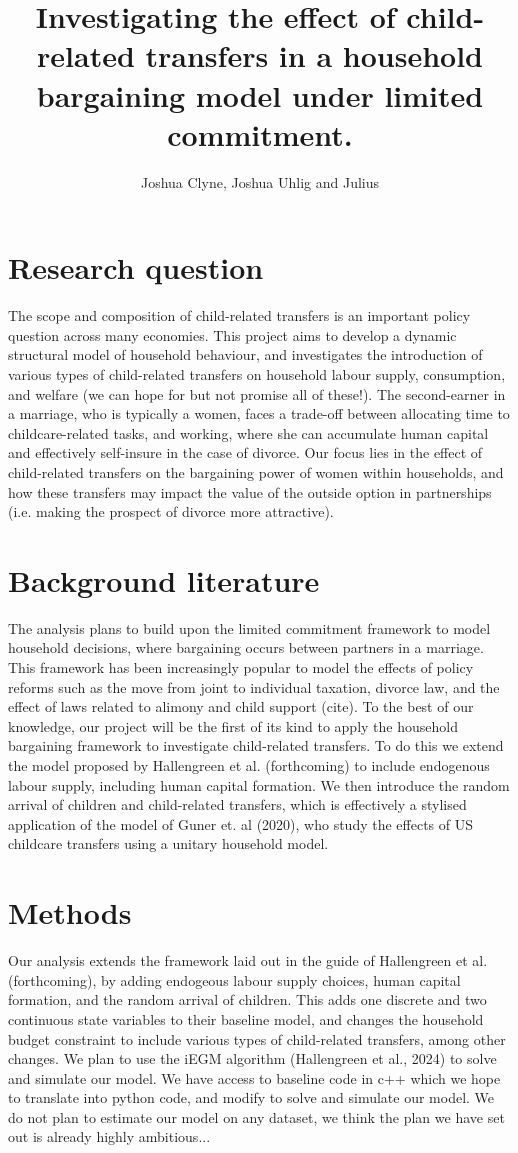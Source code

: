 \documentclass{article}
\title{Investigating the effect of child-related transfers in a household bargaining model under limited commitment.}
\author{Joshua Clyne, Joshua Uhlig and Julius}
\begin{document}
\maketitle
\section{Research question}


The scope and composition of child-related transfers is an important policy question across many economies. This project aims to develop a dynamic structural model of household behaviour, and investigates the introduction of various types of child-related transfers on household labour supply, consumption, and welfare (we can hope for but not promise all of these!). The second-earner in a marriage, who is typically a women, faces a trade-off between allocating time to childcare-related tasks, and working, where she can accumulate human capital and effectively self-insure in the case of divorce. Our focus lies in the effect of child-related transfers on the bargaining power of women within households, and how these transfers may impact the value of the outside option in partnerships (i.e. making the prospect of divorce more attractive).
\section{Background literature}
The analysis plans to build upon the limited commitment framework to model household decisions, where bargaining occurs between partners in a marriage. This framework has been increasingly popular to model the effects of policy reforms such as the move from joint to individual taxation, divorce law, and the effect of laws related to alimony and child support (cite). To the best of our knowledge, our project will be the first of its kind to apply the household bargaining framework to investigate child-related transfers. To do this we extend the model proposed by Hallengreen et al. (forthcoming) to include endogenous labour supply, including human capital formation. We then introduce the random arrival of children and child-related transfers, which is effectively a stylised application of the model of Guner et. al (2020), who study the effects of US childcare transfers using a unitary household model. 
\section{Methods}
Our analysis extends the framework laid out in the guide of Hallengreen et al. (forthcoming), by adding endogeous labour supply choices, human capital formation, and the random arrival of children. This adds one discrete and two continuous state variables to their baseline model, and changes the household budget constraint to include various types of child-related transfers, among other changes. We plan to use the iEGM algorithm (Hallengreen et al., 2024) to solve and simulate our model. We have access to baseline code in c++ which we hope to translate into python code, and modify to solve and simulate our model. We do not plan to estimate our model on any dataset, we think the plan we have set out is already highly ambitious...
\end{document}
